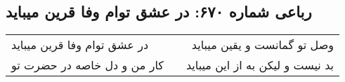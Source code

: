 \begin{center}
\section*{رباعی شماره ۶۷۰: در عشق توام وفا قرین میباید}
\label{sec:0670}
\begin{longtable}{l p{0.5cm} r}
در عشق توام وفا قرین میباید
&&
وصل تو گمانست و یقین میباید
\\
کار من و دل خاصه در حضرت تو
&&
بد نیست و لیکن به از این میباید
\\
\end{longtable}
\end{center}
